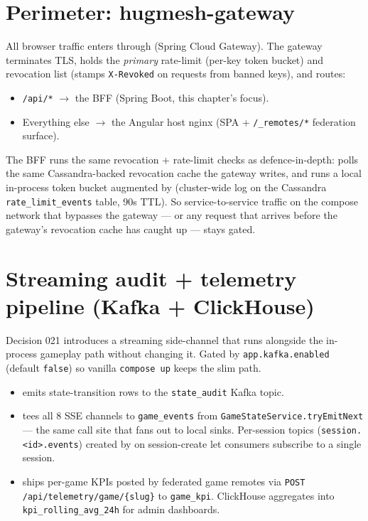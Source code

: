 \section{Perimeter: hugmesh-gateway}

All browser traffic enters through  (Spring
Cloud Gateway). The gateway terminates TLS, holds the
\emph{primary} rate-limit (per-key token bucket) and revocation list
(stamps \texttt{X-Revoked} on requests from banned keys), and routes:

\begin{itemize}
  \item \texttt{/api/*} $\rightarrow$ the BFF (Spring Boot, this
        chapter's focus).
  \item Everything else $\rightarrow$ the Angular host nginx
        (SPA + \texttt{/\_remotes/*} federation surface).
\end{itemize}

The BFF runs the same revocation + rate-limit checks as
defence-in-depth:  polls the same
Cassandra-backed revocation cache the gateway writes, and
 runs a local in-process token bucket
augmented by  (cluster-wide log
on the Cassandra \texttt{rate\_limit\_events} table, 90s TTL). So
service-to-service traffic on the compose network that bypasses the
gateway --- or any request that arrives before the gateway's
revocation cache has caught up --- stays gated.

\section{Streaming audit + telemetry pipeline (Kafka + ClickHouse)}

Decision 021 introduces a streaming side-channel that runs alongside
the in-process gameplay path without changing it. Gated by
\texttt{app.kafka.enabled} (default \texttt{false}) so vanilla
\texttt{compose up} keeps the slim path.

\begin{itemize}
  \item {} emits state-transition rows to
        the \texttt{state\_audit} Kafka topic.
  \item {} tees all 8 SSE channels to
        \texttt{game\_events} from
        \texttt{GameStateService.tryEmitNext} --- the same call site
        that fans out to local sinks. Per-session topics
        (\texttt{session.<id>.events}) created by
         on session-create let
        consumers subscribe to a single session.
  \item {} ships per-game KPIs posted by
        federated game remotes via
        \texttt{POST /api/telemetry/game/\{slug\}} to
        \texttt{game\_kpi}. ClickHouse aggregates into
        \texttt{kpi\_rolling\_avg\_24h} for admin dashboards.
\end{itemize}

